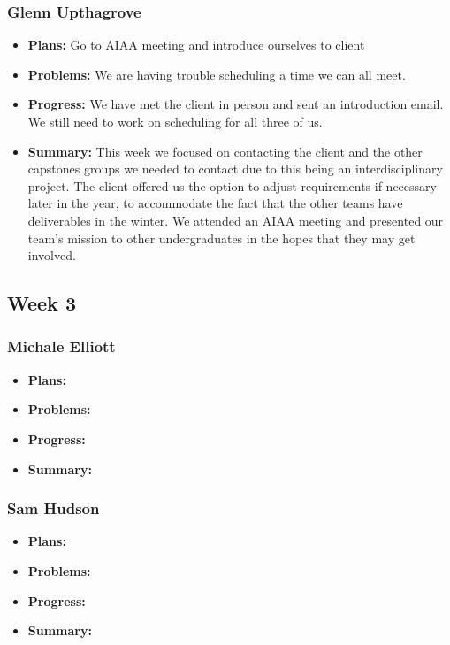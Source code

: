 \documentclass[onecolumn, draftclsnofoot,10pt, compsoc]{IEEEtran}
\begin{document}
\subsubsection{Glenn Upthagrove}
\begin {itemize}
 \item \textbf{Plans: }Go to AIAA meeting and introduce ourselves to client
 \item \textbf{Problems: }We are having trouble scheduling a time we can all meet.
 \item \textbf{Progress: }We have met the client in person and sent an introduction email. We still need to work on scheduling for all three of us. 
 \item \textbf{Summary: }This week we focused on contacting the client and the other capstones groups we needed to contact due to this being an interdisciplinary project. The client offered us the option to adjust requirements if necessary later in the year, to accommodate the fact that the other teams have deliverables in the winter. We attended an AIAA meeting and presented our team's mission to other undergraduates in the hopes that they may get involved. 
\end {itemize}
\subsection {Week 3}
\subsubsection{Michale Elliott}
\begin {itemize}
 \item \textbf{Plans: }
 \item \textbf{Problems: }
 \item \textbf{Progress: }
 \item \textbf{Summary: }
\end {itemize}
\subsubsection{Sam Hudson}
\begin {itemize}
 \item \textbf{Plans: }
 \item \textbf{Problems: }
 \item \textbf{Progress: }
 \item \textbf{Summary: }
\end {itemize}
\end{document}
